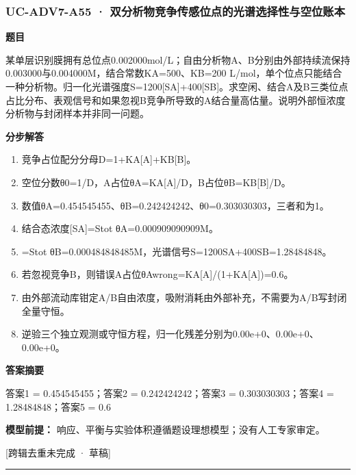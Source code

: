 \documentclass[UTF8,11pt,a4paper]{ctexart}
\begin{document}
\subsubsection*{UC-ADV7-A55 · 双分析物竞争传感位点的光谱选择性与空位账本}
\noindent\textbf{题目}\par
某单层识别膜拥有总位点0.002000mol/L；自由分析物A、B分别由外部持续流保持0.003000与0.004000M，结合常数KA=500、KB=200 L/mol，单个位点只能结合一种分析物。归一化光谱强度S=1200[SA]+400[SB]。求空闲、结合A及B三类位点占比分布、表观信号和如果忽视B竞争所导致的A结合量高估量。说明外部恒浓度分析物与封闭样本并非同一问题。\par
\medskip\noindent\textbf{分步解答}
\begin{enumerate}
\item 竞争占位配分分母D=1+KA[A]+KB[B]。
\item 空位分数θ0=1/D，A占位θA=KA[A]/D，B占位θB=KB[B]/D。
\item 数值θA=0.454545455、θB=0.242424242、θ0=0.303030303，三者和为1。
\item 结合态浓度[SA]=Stot θA=0.000909090909M。
\item [SB]=Stot θB=0.000484848485M，光谱信号S=1200SA+400SB=1.28484848。
\item 若忽视竞争B，则错误A占位θAwrong=KA[A]/(1+KA[A])=0.6。
\item 由外部流动库钳定A/B自由浓度，吸附消耗由外部补充，不需要为A/B写封闭全量守恒。
\item 逆验三个独立观测或守恒方程，归一化残差分别为0.00e+0、0.00e+0、0.00e+0。
\end{enumerate}
\noindent\textbf{答案摘要}\par
答案1 = 0.454545455；答案2 = 0.242424242；答案3 = 0.303030303；答案4 = 1.28484848；答案5 = 0.6\par
\noindent\textbf{模型前提：}
响应、平衡与实验体积遵循题设理想模型；没有人工专家审定。\par
\noindent\textcolor{red!65!black}{[跨辑去重未完成 · 草稿]} \par
\medskip\hrule\medskip
{}
\end{document}
